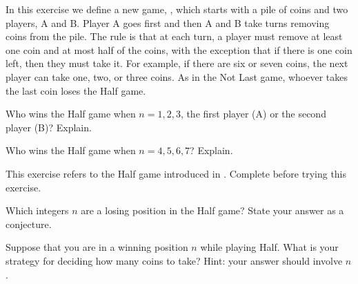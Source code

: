 \begin{exer}[\exerE] %
\label{exer_half_game123}
    In this exercise we define a new game, , which starts with a pile of coins and two players, A and B.  Player A goes first and then A and B take turns removing coins from the pile.  The rule is that at each turn, a player must remove at least one coin and at most half of the coins, with the exception that if there is one coin left, then they must take it.  For example, if there are six or seven coins, the next player can take one, two, or three coins. As in the Not Last game, whoever takes the last coin loses the Half game.   
    \begin{exerpart}
        \item Who wins the Half game when $n=1,2,3$, the first player (A) or the second player (B)? Explain.%
        \item Who wins the Half game when $n=4,5,6,7$?  Explain.  %
    \end{exerpart} 
\end{exer}

\begin{exer}[\exerE] %
\label{exer_half_conj}
    This exercise refers to the Half game introduced in . Complete  before trying this exercise.
        \begin{exerpart}
            \item Which integers $n$ are a losing position in the Half game?  State your answer as a conjecture.  %
            \item Suppose that you are in a winning position $n$ while playing Half.  What is your strategy for deciding how many coins to take?  Hint: your answer should involve $n$.
        \end{exerpart}
\end{exer}

